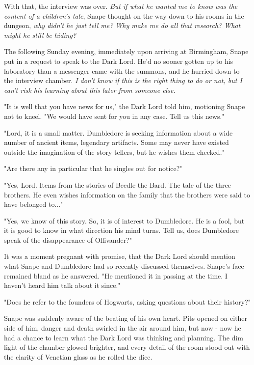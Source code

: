 \documentclass[a4paper,11pt]{article}
\begin{document}
With that, the interview was over. \emph{But if what he wanted me to know was the content of a children's tale}, Snape thought on the way down to his rooms in the dungeon, \emph{why didn't he just tell me? Why make me do all that research? What might he still be hiding?}

The following Sunday evening, immediately upon arriving at Birmingham, Snape put in a request to speak to the Dark Lord. He'd no sooner gotten up to his laboratory than a messenger came with the summons, and he hurried down to the interview chamber. \emph{I don't know if this is the right thing to do or not, but I can't risk his learning about this later from someone else.}

"It is well that you have news for us," the Dark Lord told him, motioning Snape not to kneel. "We would have sent for you in any case. Tell us this news."

"Lord, it is a small matter. Dumbledore is seeking information about a wide number of ancient items, legendary artifacts. Some may never have existed outside the imagination of the story tellers, but he wishes them checked."

"Are there any in particular that he singles out for notice?"

"Yes, Lord. Items from the stories of Beedle the Bard. The tale of the three brothers. He even wishes information on the family that the brothers were said to have belonged to..."

"Yes, we know of this story. So, it is of interest to Dumbledore. He is a fool, but it is good to know in what direction his mind turns. Tell us, does Dumbledore speak of the disappearance of Ollivander?"

It was a moment pregnant with promise, that the Dark Lord should mention what Snape and Dumbledore had so recently discussed themselves. Snape's face remained bland as he answered. "He mentioned it in passing at the time. I haven't heard him talk about it since."

"Does he refer to the founders of Hogwarts, asking questions about their history?"

Snape was suddenly aware of the beating of his own heart. Pits opened on either side of him, danger and death swirled in the air around him, but now - now he had a chance to learn what the Dark Lord was thinking and planning. The dim light of the chamber glowed brighter, and every detail of the room stood out with the clarity of Venetian glass as he rolled the dice.
\end{document}
